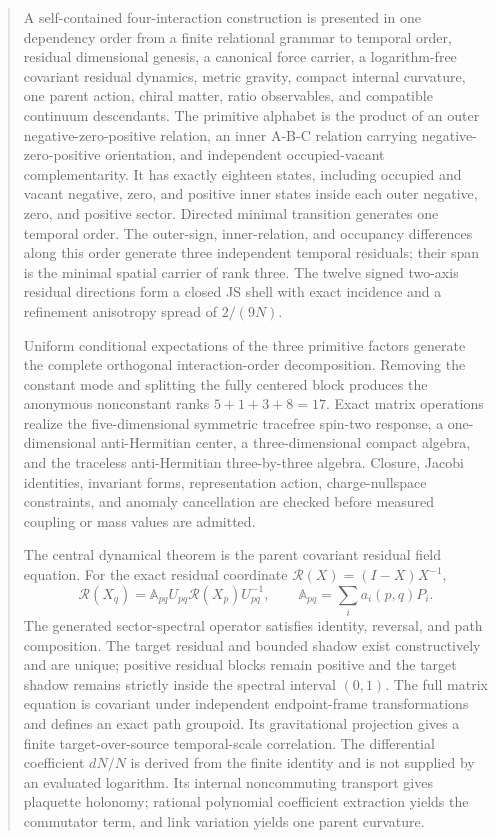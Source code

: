 \documentclass[11pt]{article}
\numberwithin{equation}{section}
\theoremstyle{remark}
\begin{document}
\begin{abstract}
A self-contained four-interaction construction is presented in one dependency order from a finite relational grammar to temporal order, residual dimensional genesis, a canonical force carrier, a logarithm-free covariant residual dynamics, metric gravity, compact internal curvature, one parent action, chiral matter, ratio observables, and compatible continuum descendants. The primitive alphabet is the product of an outer negative-zero-positive relation, an inner A-B-C relation carrying negative-zero-positive orientation, and independent occupied-vacant complementarity. It has exactly eighteen states, including occupied and vacant negative, zero, and positive inner states inside each outer negative, zero, and positive sector. Directed minimal transition generates one temporal order. The outer-sign, inner-relation, and occupancy differences along this order generate three independent temporal residuals; their span is the minimal spatial carrier of rank three. The twelve signed two-axis residual directions form a closed JS shell with exact incidence and a refinement anisotropy spread of $2/(9N)$.

Uniform conditional expectations of the three primitive factors generate the complete orthogonal interaction-order decomposition. Removing the constant mode and splitting the fully centered block produces the anonymous nonconstant ranks $5+1+3+8=17$. Exact matrix operations realize the five-dimensional symmetric tracefree spin-two response, a one-dimensional anti-Hermitian center, a three-dimensional compact algebra, and the traceless anti-Hermitian three-by-three algebra. Closure, Jacobi identities, invariant forms, representation action, charge-nullspace constraints, and anomaly cancellation are checked before measured coupling or mass values are admitted.

The central dynamical theorem is the parent covariant residual field equation. For the exact residual coordinate $\mathcal R(X)=(I-X)X^{-1}$,
\[
\mathcal R(X_q)=\mathbb A_{pq}U_{pq}\mathcal R(X_p)U_{pq}^{-1},
\qquad
\mathbb A_{pq}=\sum_i a_i(p,q)P_i.
\]
The generated sector-spectral operator satisfies identity, reversal, and path composition. The target residual and bounded shadow exist constructively and are unique; positive residual blocks remain positive and the target shadow remains strictly inside the spectral interval $(0,1)$. The full matrix equation is covariant under independent endpoint-frame transformations and defines an exact path groupoid. Its gravitational projection gives a finite target-over-source temporal-scale correlation. The differential coefficient $dN/N$ is derived from the finite identity and is not supplied by an evaluated logarithm. Its internal noncommuting transport gives plaquette holonomy; rational polynomial coefficient extraction yields the commutator term, and link variation yields one parent curvature.


\end{abstract}
\end{document}
